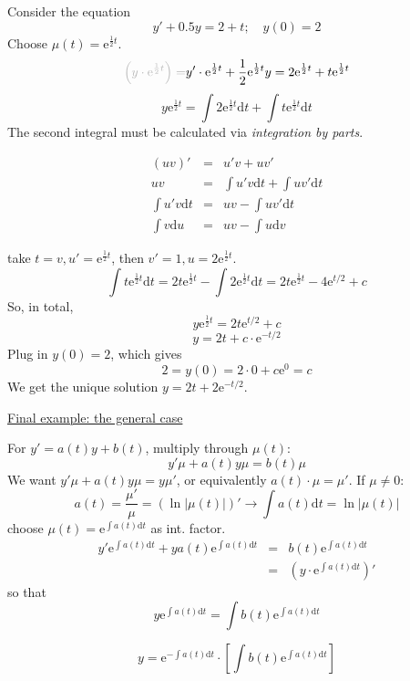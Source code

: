 \documentclass{article}
\newcommand{\mathd}{\mathrm{d}}
\newcommand{\mathe}{\mathrm{e}}
\newcommand{\nospace}{}
\newcommand{\tmem}[1]{{\em #1\/}}
\begin{document}
Consider the equation
\[ y' + 0.5 y = 2 + t ; \quad y (0) = 2 \]
Choose $\mu (t) = \mathe^{\frac{1}{2} t}$.
\[ {\color[HTML]{B8B8B8}\left( y \cdot \mathe^{\frac{1}{2} t} \right) =} y'
   \cdot \mathe^{\frac{1}{2} t} + \frac{1}{2} \mathe^{\frac{1}{2} t} y = 2
   \mathe^{\frac{1}{2} t} + t \mathe^{\frac{1}{2} t} \]
\[ y \mathe^{\frac{1}{2} t} = \int 2 \mathe^{\frac{1}{2} t} \mathd t + \int t
   \mathe^{\frac{1}{2} t} \mathd t \]
The second integral must be calculated via {\tmem{integration by parts}}.

\begin{tmornamented}
  \begin{eqnarray*}
    (uv)' & = & u' v + uv'\\
    uv & = & \int u' v \mathd t + \int uv' \mathd t\\
    \int u' v \mathd t & = & uv - \int uv' \mathd t\\
    \int v \mathd u & = & uv - \int u \mathd v
  \end{eqnarray*}
  
\end{tmornamented}

take $t = v, \nospace u' = \mathe^{\frac{1}{2} t}$, then $v' = 1, \nospace u =
2 \mathe^{\frac{1}{2} t}$.
\[ \int t \mathe^{\frac{1}{2} t} \mathd t = 2 t \mathe^{\frac{1}{2} t} - \int
   2 \mathe^{\frac{1}{2} t} \mathd t = 2 t \mathe^{\frac{1}{2} t} - 4
   \mathe^{t / 2} + c \]
So, in total,
\[ y \mathe^{\frac{1}{2} t} = 2 t \mathe^{t / 2} + c \]
\[ y = 2 t + c \cdot \mathe^{- t / 2} \]
Plug in $y (0) = 2$, which gives
\[ 2 = y (0) = 2 \cdot 0 + c \mathe^0 = c \]
We get the unique solution $y = 2 t + 2 \mathe^{- t / 2}$.

{\underline{Final example: the general case}}

For $y' = a (t) y + b (t)$, multiply through $\mu (t)$:
\[ y' \mu + a (t) y \mu = b (t) \mu \]
We want $y' \mu + a (t) y \mu = y \mu'$, or equivalently $a (t) \cdot \mu =
\mu'$. If $\mu \neq 0$:
\[ a (t) = \frac{\mu'}{\mu} = (\ln | \mu (t) |)' \rightarrow \int a (t) \mathd
   t = \ln | \mu (t) | \]
choose $\mu (t) = \mathe^{\int a (t) \mathd t}$ as int. factor.
\begin{eqnarray*}
  y' \mathe^{\int a (t) \mathd t} + ya (t) \mathe^{\int a (t) \mathd t} & = &
  b (t) \mathe^{\int a (t) \mathd t}\\
  & = & \left( y \cdot \mathe^{\int a (t) \mathd t} \right)'
\end{eqnarray*}
so that
\[ y \mathe^{\int a (t) \mathd t} = \int b (t) \mathe^{\int a (t) \mathd t} \]
\begin{tmornamented}
  \[ y = \mathe^{- \int a (t) \mathd t} \cdot \left[ \int b (t) \mathe^{\int a
     (t) \mathd t} \right] \]
\end{tmornamented}
\end{document}
